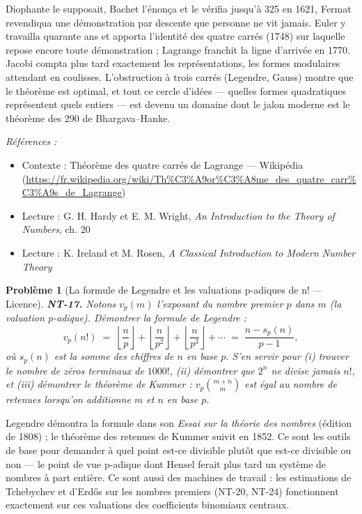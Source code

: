 \documentclass[11pt]{article}
\newtheorem{problem}{Problème}
\newenvironment{refs}{\par\small\noindent\emph{Références :}\begin{itemize}\setlength\itemsep{0pt}}{\end{itemize}\normalsize}
\begin{document}
\noindent Diophante le supposait, Bachet l'énonça et le vérifia jusqu'à 325 en 1621, Fermat
revendiqua une démonstration par descente que personne ne vit jamais. Euler y travailla quarante ans
et apporta l'identité des quatre carrés (1748) sur laquelle repose encore toute démonstration ;
Lagrange franchit la ligne d'arrivée en 1770. Jacobi compta plus tard exactement les représentations,
les formes modulaires attendant en coulisses. L'obstruction à trois carrés (Legendre, Gauss) montre
que le théorème est optimal, et tout ce cercle d'idées --- quelles formes quadratiques représentent
quels entiers --- est devenu un domaine dont le jalon moderne est le théorème des 290 de
Bhargava--Hanke.

\begin{refs}
\item Contexte : Théorème des quatre carrés de Lagrange --- Wikipédia (\url{https://fr.wikipedia.org/wiki/Th%C3%A9or%C3%A8me_des_quatre_carr%C3%A9s_de_Lagrange})
\item Lecture : G. H. Hardy et E. M. Wright, \textit{An Introduction to the Theory of Numbers}, ch. 20
\item Lecture : K. Ireland et M. Rosen, \textit{A Classical Introduction to Modern Number Theory}
\end{refs}

\bigskip

\begin{problem}[{La formule de Legendre et les valuations p-adiques de n! --- Licence}]
\textbf{NT-17.} Notons $v_p(m)$ l'exposant du nombre premier
$p$ dans $m$ (la valuation p-adique). Démontrer la formule de Legendre :
\[ v_p(n!) \;=\; \left\lfloor \frac{n}{p} \right\rfloor + \left\lfloor \frac{n}{p^2} \right\rfloor + \left\lfloor \frac{n}{p^3} \right\rfloor + \cdots \;=\; \frac{n - s_p(n)}{p - 1}, \]
où $s_p(n)$ est la somme des chiffres de $n$ en base $p$. S'en servir pour (i) trouver le
nombre de zéros terminaux de $1000!$, (ii) démontrer que $2^n$ ne divise jamais $n!$, et
(iii) démontrer le théorème de Kummer : $v_p\binom{m+n}{m}$ est égal au nombre de retenues
lorsqu'on additionne $m$ et $n$ en base $p$.
\end{problem}

\noindent Legendre démontra la formule dans son \textit{Essai sur la théorie des nombres}
(édition de 1808) ; le théorème des retenues de Kummer suivit en 1852. Ce sont les outils de base
pour demander \og{} à quel point est-ce divisible \fg{} plutôt que \og{} est-ce divisible ou non \fg{} --- le point de
vue p-adique dont Hensel ferait plus tard un système de nombres à part entière. Ce sont aussi des
machines de travail : les estimations de Tchebychev et d'Erd\H{o}s sur les nombres premiers (NT-20,
NT-24) fonctionnent exactement sur ces valuations des coefficients binomiaux centraux.
\end{document}

